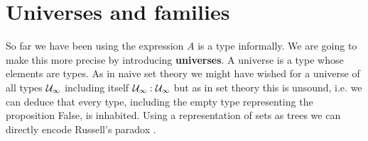 


\section{Universes and families}
\label{sec:universes}

So far we have been using the expression $A$ is a type informally. We
are going to make this more precise by introducing \textbf{universes}.
A universe is a type whose elements are types. As in naive set theory
we might have wished for a universe of all types $\mathcal{U}_\infty$ including itself
$\mathcal{U}_\infty : \mathcal{U}_\infty$ but as in set
theory this is unsound, i.e. we can deduce that every type,
including the empty type representing the proposition False, is inhabited. Using a
representation of sets as trees we can directly encode Russell's
paradox \cite{thierry:trees}.

